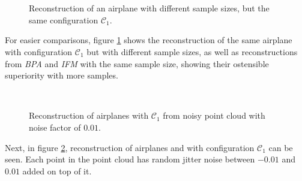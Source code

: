\begin{figure}[htbp]
  \centering
  \\
  \\
  \caption{Reconstruction of an airplane with different sample sizes, but the same configuration $\mathcal{C}_1$.} \label{fig:7}
\end{figure}

  For easier comparisons, figure \ref{fig:7} shows the reconstruction of the same airplane with configuration $\mathcal{C}_1$ but with
  different sample sizes, as well as reconstructions from \emph{BPA} and \emph{IFM} with the same sample size, showing their ostensible
  superiority with more samples.


  \begin{figure}[htbp]
    \centering
    \\
    \caption{Reconstruction of airplanes with $\mathcal{C}_1$ from noisy point cloud with noise factor of $0.01$. } \label{fig:81}
  \end{figure}
  Next, in figure \ref{fig:81}, reconstruction of airplanes and with configuration $\mathcal{C}_1$ can be seen. Each point in the point 
  cloud has random
  jitter noise between $-0.01$ and $0.01$ added on top of it.


